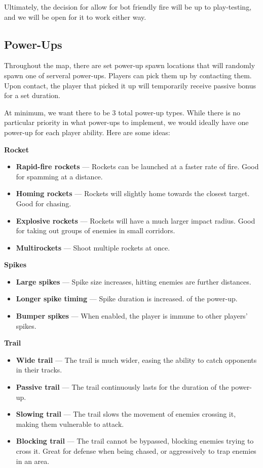 \documentclass{article}
\theoremstyle{definition}
\begin{document}
Ultimately, the decision for allow for bot friendly fire will be up to
play-testing, and we will be open for it to work either way.

\subsection{Power-Ups}

Throughout the map, there are set power-up spawn locations that will randomly
spawn one of serveral power-ups. Players can pick them up by contacting them.
Upon contact, the player that picked it up will temporarily receive passive
bonus for a set duration.

At minimum, we want there to be 3 total power-up types. While there is no
particular priority in what power-ups to implement, we would ideally have one
power-up for each player ability. Here are some ideas:

\textbf{Rocket}
\begin{itemize}
  \item \textbf{Rapid-fire rockets} --- Rockets can be launched at a faster rate of
    fire. Good for spamming at a distance.
  \item \textbf{Homing rockets} --- Rockets will slightly home towards the
    closest target. Good for chasing.
  \item \textbf{Explosive rockets} --- Rockets will have a much larger impact
    radius. Good for taking out groups of enemies in small corridors.
  \item \textbf{Multirockets} --- Shoot multiple rockets at once.
\end{itemize}

\textbf{Spikes}
\begin{itemize}
  \item \textbf{Large spikes} --- Spike size increases, hitting enemies are
    further distances.
  \item \textbf{Longer spike timing} --- Spike duration is increased.
    of the power-up.
  \item \textbf{Bumper spikes} --- When enabled, the player is immune to other
    players' spikes.
\end{itemize}

\textbf{Trail}
\begin{itemize}
  \item \textbf{Wide trail} --- The trail is much wider, easing the ability to
    catch opponents in their tracks.
  \item \textbf{Passive trail} --- The trail continuously lasts for the duration
    of the power-up.
  \item \textbf{Slowing trail} --- The trail slows the movement of enemies
    crossing it, making them vulnerable to attack.
  \item \textbf{Blocking trail} --- The trail cannot be bypassed, blocking
    enemies trying to cross it. Great for defense when being chased, or
    aggressively to trap enemies in an area.
\end{itemize}
\end{document}
